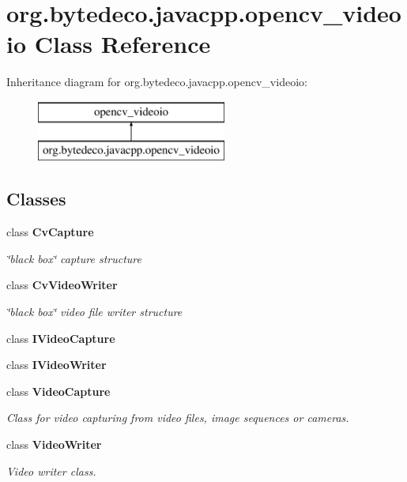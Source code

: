 \hypertarget{classorg_1_1bytedeco_1_1javacpp_1_1opencv__videoio}{}\section{org.\+bytedeco.\+javacpp.\+opencv\+\_\+videoio Class Reference}
\label{classorg_1_1bytedeco_1_1javacpp_1_1opencv__videoio}
Inheritance diagram for org.\+bytedeco.\+javacpp.\+opencv\+\_\+videoio\+:\begin{figure}[H]
\begin{center}
\leavevmode
\includegraphics[height=2.000000cm]{classorg_1_1bytedeco_1_1javacpp_1_1opencv__videoio}
\end{center}
\end{figure}
\subsection*{Classes}
\begin{DoxyCompactItemize}
\item 
class {\bfseries Cv\+Capture}
\begin{DoxyCompactList}\small\item\em \char`\"{}black box\char`\"{} capture structure \end{DoxyCompactList}\item 
class {\bfseries Cv\+Video\+Writer}
\begin{DoxyCompactList}\small\item\em \char`\"{}black box\char`\"{} video file writer structure \end{DoxyCompactList}\item 
class {\bfseries I\+Video\+Capture}
\item 
class {\bfseries I\+Video\+Writer}
\item 
class {\bfseries Video\+Capture}
\begin{DoxyCompactList}\small\item\em Class for video capturing from video files, image sequences or cameras. \end{DoxyCompactList}\item 
class {\bfseries Video\+Writer}
\begin{DoxyCompactList}\small\item\em Video writer class. \end{DoxyCompactList}\end{DoxyCompactItemize}
